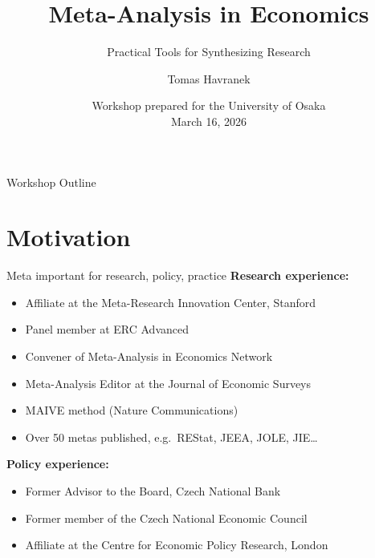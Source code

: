 \documentclass{beamer} %
\title[Meta Workshop for the University of Osaka] %
{Meta-Analysis in Economics}
\subtitle{Practical Tools for Synthesizing Research}
\author[T.\ Havranek] %
{ Tomas Havranek
}
\institute[Prague] %
{
  	Charles University, Prague\\ Centre for Economic Policy Research, London \\ Meta-Research Innovation Center, Stanford

  
}%
\date[March 16, 2026] %
{Workshop prepared for the University of Osaka\\[2ex]
  March 16, 2026
}%
\begin{document}
\begin{frame}
  \titlepage
\end{frame}


\begin{frame}{Workshop Outline}
  \tableofcontents
\end{frame}


\section{Motivation}



\begin{frame}{Meta important for research, policy, practice}
\textbf{Research experience:}
\begin{itemize}
	\item Affiliate at the Meta-Research Innovation Center, Stanford
	\item Panel member at ERC Advanced
		\item Convener of Meta-Analysis in Economics Network
		\item Meta-Analysis Editor at the Journal of Economic Surveys
		\item MAIVE method (Nature Communications)
				\item Over 50 metas published, e.g.\ REStat, JEEA, JOLE, JIE\ldots
\end{itemize}

\bigskip

\textbf{Policy experience:}

\begin{itemize}
	\item Former Advisor to the Board, Czech National Bank
	\item Former member of the Czech National Economic Council
	\item Affiliate at the Centre for Economic Policy Research, London
\end{itemize}


\end{frame}
\end{document}
